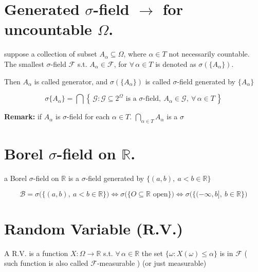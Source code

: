 \documentclass[
  letterpaper,
  DIV=11,
  numbers=noendperiod]{scrreprt}
\theoremstyle{definition}
\theoremstyle{plain}
\theoremstyle{plain}
\theoremstyle{definition}
\theoremstyle{plain}
\theoremstyle{plain}
\theoremstyle{remark}
\begin{document}
\section{\texorpdfstring{Generated \(\sigma\)-field \(\to\) for
uncountable
\(\Omega\).}{Generated \textbackslash sigma-field \textbackslash to for uncountable \textbackslash Omega.}}\label{generated-sigma-field-to-for-uncountable-omega.}

suppose a collection of subset \(A_\alpha \subseteq \Omega\), where
\(\alpha \in T\) not necessarily countable. The smallest
\(\sigma\)-field \(\mathcal{F}\) s.t. \(A_\alpha \in \mathcal{F}\), for
\(\forall\, \alpha \in T\) is denoted as \(\sigma(\{A_\alpha\})\).

Then \(A_\alpha\) is called generator, and \(\sigma(\{A_\alpha\})\) is
called \(\sigma\)-field generated by \(\{A_\alpha\}\)

\[
\sigma\{A_\alpha\} = \bigcap \left\{\, \mathcal{G} : \mathcal{G} \subseteq 2^\Omega \text{ is a } \sigma\text{-field}, \ A_\alpha \in \mathcal{G}, \ \forall\, \alpha \in T \,\right\}
\]

\textbf{Remark:} if \(A_\alpha\) is \(\sigma\)-field for each
\(\alpha \in T\). \(\bigcap_{\alpha \in T} A_\alpha\) is a \(\sigma\)

\section{\texorpdfstring{Borel \(\sigma\)-field on
\(\mathbb{R}\).}{Borel \textbackslash sigma-field on \textbackslash mathbb\{R\}.}}\label{borel-sigma-field-on-mathbbr.}

a Borel \(\sigma\)-field on \(\mathbb{R}\) is a \(\sigma\)-field
generated by \(\{(a,b), \ a<b \in \mathbb{R}\}\)

\[
\mathcal{B} = \sigma\big(\{(a,b), \ a<b \in \mathbb{R}\}\big) \iff \sigma\big(\{O \subseteq \mathbb{R} \text{ open}\}\big) \iff \sigma\big(\{(-\infty, b], \ b \in \mathbb{R}\}\big)
\]

\section{Random Variable (R.V.)}\label{random-variable-r.v.}

A R.V. is a function \(X : \Omega \to \mathbb{R}\) s.t.
\(\forall\, \alpha \in \mathbb{R}\) the set
\(\{\omega : X(\omega) \leq \alpha\}\) is in \(\mathcal{F}\) ( such
function is also called \(\mathcal{F}\)-measurable ) (or just
measurable)
\end{document}
